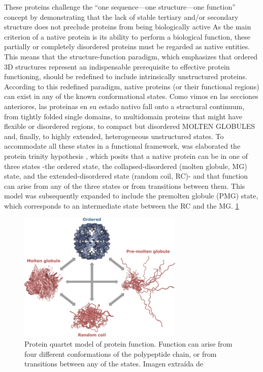 These proteins challenge the “one sequence—one structure—one function” concept by demonstrating that the lack of stable tertiary and/or secondary structure does not preclude proteins from being biologically active
As the main criterion of a native protein is its ability to perform a biological function, these partially or completely disordered proteins must be regarded as native entities.
This means that the structure-function paradigm, which emphasizes that ordered 3D structures represent an indispensable prerequisite to effective protein functioning, should be redefined to include intrinsically unstructured proteins. 
According to this redefined paradigm, native proteins (or their functional regions) can exist in any of the known conformational states.
Como vimos en las secciones anteriores, las proteinas en su estado nativo fall onto a structural continuum, from tightly folded single domains, to multidomain proteins that might have flexible or disordered regions, 
to compact but disordered MOLTEN GLOBULES and, finally, to highly extended, heterogeneous unstructured states.
To accommodate all these states in a functional framework, was elaborated the protein trinity hypothesis \cite{dunker2001protein} ,
which posits that a native protein can be in one of three states -the ordered state, the collapsed-disordered (molten globule, MG) state, and the extended-disordered state (random coil, RC)- and that function can arise from any of the
three states or from transitions between them. This model was subsequently expanded to include the premolten globule (PMG) state, which corresponds to an intermediate state between the RC and the MG. \ref{proteinQuartet} 


\begin{figure}[htbp]
\centering
\includegraphics[width=0.7\textwidth]{img/proteinQuartet.jpg} 
\caption{Protein quartet model of protein function. 
Function can arise from four different conformations of the polypeptide chain, or from transitions between any of the states. Imagen extraída de \cite{uversky2002natively}}
\label{proteinQuartet}
\end{figure}















